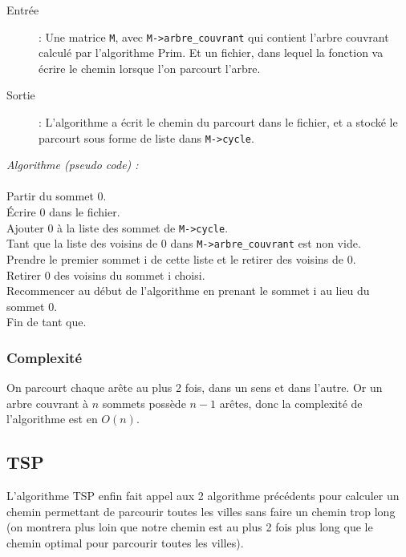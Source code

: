 \documentclass[a4paper,11pt]{article}
\begin{document}
\begin{description}
\item[Entrée] : Une matrice \texttt{M}, avec \texttt{M->arbre\_couvrant} qui contient l'arbre couvrant calculé par l'algorithme Prim. Et un fichier, dans lequel la fonction va écrire le chemin lorsque l'on parcourt l'arbre.
\item[Sortie] : L'algorithme a écrit le chemin du parcourt dans le fichier, et a stocké le parcourt sous forme de liste dans \texttt{M->cycle}.\\
\end{description}
\textit{Algorithme (pseudo code) :}\\
\\
Partir du sommet 0.\\
Écrire 0 dans le fichier.\\
Ajouter 0 à la liste des sommet de \texttt{M->cycle}.\\
Tant que la liste des voisins de 0 dans \texttt{M->arbre\_couvrant} est non vide.\\
\hspace*{1cm}Prendre le premier sommet i de cette liste et le retirer des voisins de 0.\\
\hspace*{1cm}Retirer 0 des voisins du sommet i choisi.\\
\hspace*{1cm}Recommencer au début de l'algorithme en prenant le sommet i au lieu du sommet 0.\\
Fin de tant que.\\

\subsubsection*{Complexité}
On parcourt chaque arête au plus 2 fois, dans un sens et dans l'autre. Or un arbre couvrant à $n$ sommets possède $n-1$ arêtes, donc la complexité de l'algorithme est en $O(n)$.

\subsection{TSP}

L'algorithme TSP enfin fait appel aux 2 algorithme précédents pour calculer un chemin permettant de parcourir toutes les villes sans faire un chemin trop long (on montrera plus loin que notre chemin est au plus 2 fois plus long que le chemin optimal pour parcourir toutes les villes).
\end{document}
